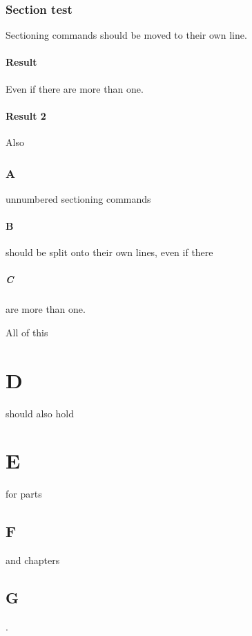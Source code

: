 \section{Section test}

Sectioning commands should be moved to their own line.
\subsection{Result} Even if there are more than one.
\subsection{Result 2}

Also
\section*{A} unnumbered sectioning commands
\subsection*{B} should be split onto their own lines, even if there
\subsubsection*{C} are more than one.

All of this
\part{D} should also hold
\part*{E} for parts
\chapter{F} and chapters
\chapter*{G}.
